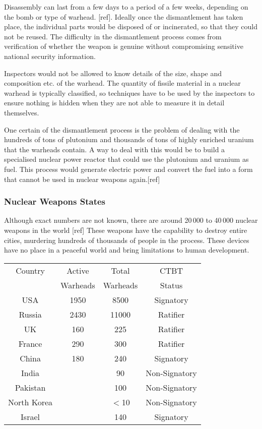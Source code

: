 \documentclass[twocolumn,a4paper]{article}
\begin{document}
Disassembly can last from a few days to a period of a few weeks, depending on 
the bomb or type of warhead. [ref]. Ideally once the dismantlement has taken 
place, the individual parts would be disposed of or incinerated, so that they 
could not be reused. The difficulty in the dismantlement process comes from 
verification of whether the weapon is genuine without compromising sensitive 
national security information.

Inspectors would not be allowed to know details of the size, shape and 
composition etc. of the warhead. The quantity of fissile material in a nuclear 
warhead is typically classified, so techniques have to be used by the inspectors 
to ensure nothing is hidden when they are not able to measure it in detail 
themselves.

One certain of the dismantlement process is the problem of dealing with the 
hundreds of tons of plutonium and thousands of tons of highly enriched uranium 
that the warheads contain. A way to deal with this would be to build a 
specialised nuclear power reactor that could use the plutonium and uranium as 
fuel. This process would generate electric power and convert the fuel into a 
form that cannot be used in nuclear weapons again.[ref]

\subsubsection{Nuclear Weapons States}
Although exact numbers are not known, there are around 20\,000 to 40\,000 
nuclear weapons in the world [ref] These weapons have the capability to destroy 
entire cities, murdering hundreds of thousands of people in the process. These 
devices have no place in a peaceful world and bring limitations to human development. 

\begin{tabular}{|c|c|c|c|}
  \hline
  Country 		& Active 	& Total 	& CTBT 	\\
   			& Warheads 	& Warheads 	& Status \\
  \hline
  USA 		 	& 1950 	& 8500 		& Signatory 	\\
  Russia 		& 2430 	& 11000 	& Ratifier 	\\
  UK 			& 160 	& 225 		& Ratifier 	\\
  France		& 290	& 300		& Ratifier	\\
  China			& 180	& 240		& Signatory	\\
  India			&	& 90		& Non-Signatory	\\
  Pakistan		&	& 100		& Non-Signatory \\
  North Korea		&	& \(<\)10 	& Non-Signatory \\
  Israel		&	& 140		& Signatory	\\
  \hline
\end{tabular}
\end{document}
